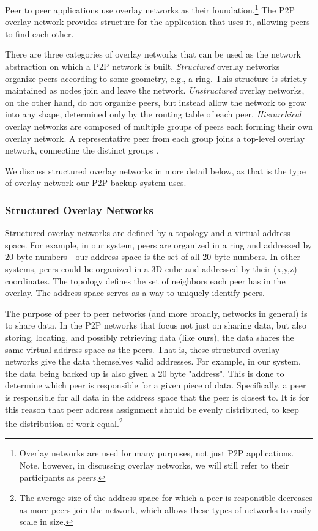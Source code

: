 \documentclass[12pt]{report}
\begin{document}
Peer to peer applications use overlay networks as their foundation.\footnote{Overlay networks are used for many purposes, not just P2P applications. Note, however, in discussing overlay networks, we will still refer to their participants as \textit{peers}.}  The P2P overlay network provides structure for the application that uses it, allowing peers to find each other.

There are three categories of overlay networks that can be used as the network abstraction on which a P2P network is built. \textit{Structured} overlay networks organize peers according to some geometry, e.g., a ring. This structure is strictly maintained as nodes join and leave the network. \textit{Unstructured} overlay networks, on the other hand, do not organize peers, but instead allow the network to grow into any shape, determined only by the routing table of each peer. \textit{Hierarchical} overlay networks are composed of multiple groups of peers each forming their own overlay network. A representative peer from each group joins a top-level overlay network, connecting the distinct groups \cite{p2pSurvey}.

We discuss structured overlay networks in more detail below, as that is the type of overlay network our P2P backup system uses.

\subsubsection{Structured Overlay Networks} \label{subsubsec:StructuredOverlayNetworks}

Structured overlay networks are defined by a topology and a virtual address space. For example, in our system, peers are organized in a ring and addressed by 20 byte numbers---our address space is the set of all 20 byte numbers. In other systems, peers could be organized in a 3D cube and addressed by their (x,y,z) coordinates. The topology defines the set of neighbors each peer has in the overlay. The address space serves as a way to uniquely identify peers.

The purpose of peer to peer networks (and more broadly, networks in general) is to share data. In the P2P networks that focus not just on sharing data, but also storing, locating, and possibly retrieving data (like ours), the data shares the same virtual address space as the peers. That is, these structured overlay networks give the data themselves valid addresses. For example, in our system, the data being backed up is also given a 20 byte "address". This is done to determine which peer is responsible for a given piece of data. Specifically, a peer is responsible for all data in the address space that the peer is closest to. It is for this reason that peer address assignment should be evenly distributed, to keep the distribution of work equal.\footnote{The average size of the address space for which a peer is responsible decreases as more peers join the network, which allows these types of networks to easily scale in size.}
\end{document}
